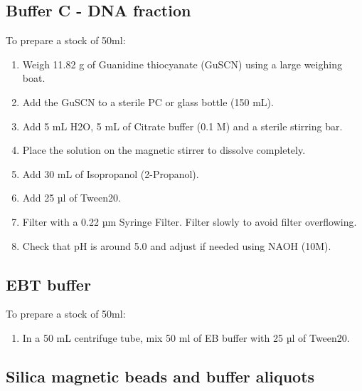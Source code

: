 \documentclass[
]{book}
\providecommand{\tightlist}{%
  \setlength{\itemsep}{0pt}\setlength{\parskip}{0pt}}
\begin{document}
\hypertarget{buffer-c---dna-fraction}{%
\subsection*{Buffer C - DNA fraction}\label{buffer-c---dna-fraction}}

To prepare a stock of 50ml:

\begin{enumerate}
\def\labelenumi{\arabic{enumi}.}
\tightlist
\item
  Weigh 11.82 g of Guanidine thiocyanate (GuSCN) using a large weighing boat.
\item
  Add the GuSCN to a sterile PC or glass bottle (150 mL).
\item
  Add 5 mL H2O, 5 mL of Citrate buffer (0.1 M) and a sterile stirring bar.
\item
  Place the solution on the magnetic stirrer to dissolve completely.
\item
  Add 30 mL of Isopropanol (2-Propanol).
\item
  Add 25 µl of Tween20.
\item
  Filter with a 0.22 µm Syringe Filter. Filter slowly to avoid filter overflowing.
\item
  Check that pH is around 5.0 and adjust if needed using NAOH (10M).
\end{enumerate}

\hypertarget{ebt-buffer}{%
\subsection*{EBT buffer}\label{ebt-buffer}}

To prepare a stock of 50ml:

\begin{enumerate}
\def\labelenumi{\arabic{enumi}.}
\tightlist
\item
  In a 50 mL centrifuge tube, mix 50 ml of EB buffer with 25 µl of Tween20.
\end{enumerate}

\hypertarget{silica-magnetic-beads-and-buffer-aliquots}{%
\subsection*{Silica magnetic beads and buffer aliquots}\label{silica-magnetic-beads-and-buffer-aliquots}}
\end{document}
